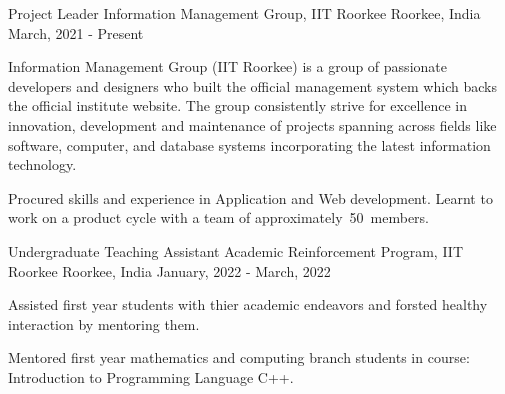 

\begin{cventries}

\cventry
{Project Leader} %
{Information Management Group, IIT Roorkee} %
{Roorkee, India} %
{March, 2021 - Present} %
{
  \begin{cvitems} %
    \item Information Management Group (IIT Roorkee) is a group of passionate developers and designers who built the official management system which backs the official institute website. The group consistently strive for excellence in innovation, development and maintenance of projects spanning across fields like software, computer, and database systems incorporating the latest information technology.
    \item Procured skills and experience in Application and Web development. Learnt to work on a product cycle with a team of approximately 50 members.
  \end{cvitems}
}


\cventry
{Undergraduate Teaching Assistant} %
{Academic Reinforcement Program, IIT Roorkee} %
{Roorkee, India} %
{January, 2022 - March, 2022} %
{
	\begin{cvitems} %
		\item Assisted first year students with thier academic endeavors and forsted healthy interaction by mentoring them.
		\item Mentored first year mathematics and computing branch students in course: Introduction to Programming Language C++. 
	\end{cvitems}
}



\end{cventries}
